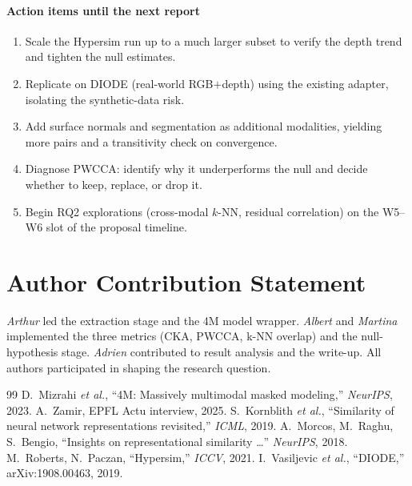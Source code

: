 \documentclass[10pt,conference,compsocconf]{IEEEtran}
\begin{document}
\paragraph{Action items until the next report}
\begin{enumerate}\itemsep0pt
  \item Scale the Hypersim run up to a much larger subset to verify
        the depth trend and tighten the null estimates.
  \item Replicate on DIODE (real-world RGB$+$depth) using the
        existing adapter, isolating the synthetic-data risk.
  \item Add surface normals and segmentation as additional
        modalities, yielding more pairs and a transitivity check on
        convergence.
  \item Diagnose PWCCA: identify why it underperforms the null and
        decide whether to keep, replace, or drop it.
  \item Begin RQ2 explorations (cross-modal $k$-NN, residual
        correlation) on the W5--W6 slot of the proposal timeline.
\end{enumerate}

\section{Author Contribution Statement}
\textit{Arthur} led the extraction stage and the 4M model wrapper.
\textit{Albert} and \textit{Martina} implemented the three metrics
(CKA, PWCCA, k-NN overlap) and the null-hypothesis stage. \textit{Adrien} contributed to result
analysis and the write-up. All authors participated in shaping the
research question.


\begin{thebibliography}{99}\small
{} D.~Mizrahi \emph{et al.}, ``4M: Massively multimodal masked modeling,'' \emph{NeurIPS}, 2023.
 A.~Zamir, EPFL Actu interview, 2025.
 S.~Kornblith \emph{et al.}, ``Similarity of neural network representations revisited,'' \emph{ICML}, 2019.
 A.~Morcos, M.~Raghu, S.~Bengio, ``Insights on representational similarity \ldots'' \emph{NeurIPS}, 2018.
 M.~Roberts, N.~Paczan, ``Hypersim,'' \emph{ICCV}, 2021.
 I.~Vasiljevic \emph{et al.}, ``DIODE,'' arXiv:1908.00463, 2019.
\end{thebibliography}
\end{document}
